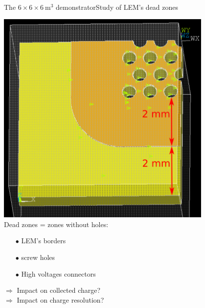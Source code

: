 \documentclass[10pt]{beamer}
\begin{document}
    \begin{frame}{The \texorpdfstring{$6 \times 6 \times \SI{6}{\meter\cubed}$}{666}
    		 demonstrator}{Study of LEM's dead zones}
   		\begin{scriptsize}
    		\begin{minipage}{0.38\textwidth}
    			\includegraphics[width=0.8\textwidth]{figures/666/corner_annotations.png}
    			\vspace{0.5cm}\\
    				Dead zones = zones without holes:
    				\begin{itemize}
    					\item[$\bullet$] LEM's borders
    					\item[$\bullet$] screw holes
    					\item[$\bullet$] High voltages connectors
    				\end{itemize}
    				$\Rightarrow$ Impact on collected charge?\\
    				$\Rightarrow$ Impact on charge resolution?\\
    				

\end{minipage}
\end{scriptsize}
\end{frame}
\end{document}
